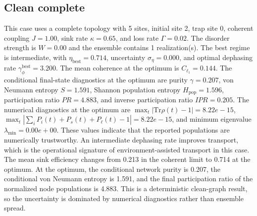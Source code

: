 \subsection{Clean complete}
This case uses a complete topology with 5 sites, initial site 2, trap site 0, coherent coupling $J=1.00$, sink rate $\kappa=0.65$, and loss rate $\Gamma=0.02$. The disorder strength is $W=0.00$ and the ensemble contains 1 realization(s).
The best regime is intermediate, with $\eta_{\mathrm{best}}=0.714$, uncertainty $\sigma_\eta=0.000$, and optimal dephasing rate $\gamma_\phi^{\mathrm{best}}=3.200$. The mean coherence at the optimum is $C_{\ell_1}=0.144$.
The conditional final-state diagnostics at the optimum are purity $\gamma=0.207$, von Neumann entropy $S=1.591$, Shannon population entropy $H_\mathrm{pop}=1.596$, participation ratio $PR=4.883$, and inverse participation ratio $IPR=0.205$.
The numerical diagnostics at the optimum are $\max_t |\mathrm{Tr}\rho(t)-1|=8.22e-15$, $\max_t |\sum_i P_i(t)+P_s(t)+P_\ell(t)-1|=8.22e-15$, and minimum eigenvalue $\lambda_\mathrm{min}=0.00e+00$. These values indicate that the reported populations are numerically trustworthy.
An intermediate dephasing rate improves transport, which is the operational signature of environment-assisted transport in this case. The mean sink efficiency changes from 0.213 in the coherent limit to 0.714 at the optimum. At the optimum, the conditional network purity is 0.207, the conditional von Neumann entropy is 1.591, and the final participation ratio of the normalized node populations is 4.883. This is a deterministic clean-graph result, so the uncertainty is dominated by numerical diagnostics rather than ensemble spread.

